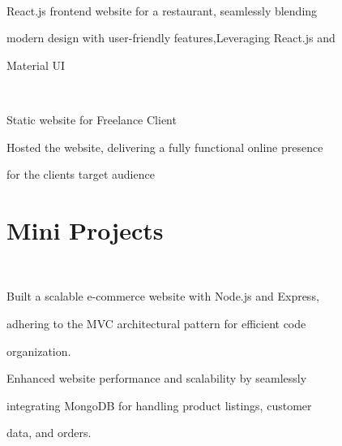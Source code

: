 \documentclass[]{deedy-resume-openfont}
\begin{document}
        
            \hfill
             \\
            \begin{tightemize}
\item  React.js frontend website for a restaurant, seamlessly blending
\item[] modern design with user-friendly features,Leveraging React.js and
\item[] Material UI
\end{tightemize}
            \sectionsep
            \hfill
            \\
            \begin{tightemize}
\item  Static website for Freelance Client
\item  Hosted the website, delivering a fully functional online presence
\item[] for the clients target audience
\end{tightemize}
\vspace{200pt}

\section{Mini Projects }
            \sectionsep
    
             \hfill {}\\
            \begin{tightemize}
\item  Built a scalable e-commerce website with Node.js and Express,
\item[] adhering to the MVC architectural pattern for efficient code
\item[] organization.
\item  Enhanced website performance and scalability by seamlessly
\item[] integrating MongoDB for handling product listings, customer
\item[] data, and orders.
\end{tightemize}
\end{document}

